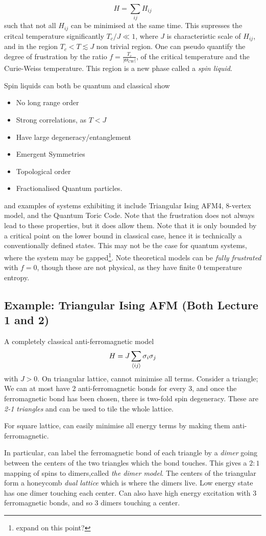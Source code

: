 \documentclass[a4paper]{article}
\begin{document}
\[ H=\sum_{ij}H_{ij}\]
such that not all $H_{ij}$ can be minimised at the same time.
This supresses the critcal temperature significantly $T_c/J\ll 1$, where $J$ is
characteristic scale of $H_{ij}$, and in the
region $T_c<T\lesssim J$ non trivial region. One can pseudo quantify the degree
of frustration by the ratio $f=\frac{T_c}{|\Theta_{CW}|}$, of the critical
temperature and the Curie-Weiss temperature. This region is a new phase called a \emph{spin
liquid}.
\begin{remark}
    Spin liquids can both be quantum and classical show 
    \begin{itemize}
        \item No long range order
        \item Strong correlations, as $T<J$
        \item Have large degeneracy/entanglement
        \item Emergent Symmetries
        \item Topological order
        \item Fractionalised Quantum particles.
    \end{itemize}
    and examples of systems exhibiting it include Triangular Ising AFM4, 8-vertex
    model, and the Quantum Toric Code. Note that the frustration does not always
    lead to these properties, but it does allow them. 
    Note that it is only bounded by a critical point on the lower bound in classical
    case, hence it is technically a conventionally defined states. This may not
    be the case for quantum systems, where the system may be
    gapped\footnote{expand on this point?}. Note theoretical models can be
    \emph{fully frustrated} with $f=0$, though these are not physical, as they
    have finite 0 temperature entropy.
\end{remark}
\subsection{Example: Triangular Ising AFM (Both Lecture 1 and 2)}
A completely classical anti-ferromagnetic model 
\[ H= J\sum_{\braket{ij}}\sigma_i\sigma_j\]
with $J>0$. On triangular lattice, cannot minimise all terms. Consider
a triangle; We can at most have 2 anti-ferromagnetic bonds for every 3, and
once the ferromagnetic bond has been chosen, there is two-fold spin
degeneracy. These are \emph{2-1 triangles} and can be used to tile the whole
lattice. 

\begin{remark}
For square lattice, can easily minimise all energy terms by making them
anti-ferromagnetic.
\end{remark}
In particular, can label the ferromagnetic bond of each triangle by
a \emph{dimer} going between the centers of the two triangles which the bond
touches. This gives a $2:1$ mapping of spins to dimers,called \emph{the
dimer model}. The centers of the triangular form a honeycomb \emph{dual
lattice} which is where the dimers live. Low energy state has one dimer touching
each center. Can also have high energy excitation with 3 ferromagnetic bonds,
and so 3 dimers touching a center.
\end{document}
